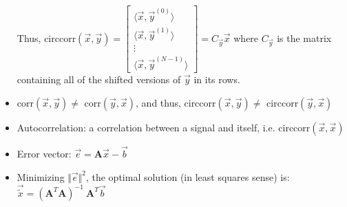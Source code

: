 \documentclass{article}
\begin{document}
\begin{itemize}
		Thus, circcorr$(\vec{x}, \vec{y}) = \begin{bmatrix}
		\big\langle \vec{x}, \vec{y}^{(0)} \big\rangle \\
		\big\langle \vec{x}, \vec{y}^{(1)} \big\rangle \\
		\vdots \\
		\big\langle \vec{x}, \vec{y}^{(N-1)} \big\rangle
		\end{bmatrix} = C_{\vec{y}} \vec{x}$
		where $C_{\vec{y}}$ is the matrix containing all of the shifted versions of $\vec{y}$ in its rows.
	\item corr$(\vec{x}, \vec{y}) \neq$ corr$(\vec{y}, \vec{x})$, and thus,
		circcorr$(\vec{x}, \vec{y}) \neq$ circcorr$(\vec{y}, \vec{x})$
	\item {\color{blue} Autocorrelation}: a correlation between a signal and itself, i.e. circcorr$(\vec{x}, \vec{x})$
\end{itemize}



\begin{itemize}
	\item Error vector: $\vec{e} = \mathbf{A}\vec{x} - \vec{b}$
	\item Minimizing $\Vert\vec{e}\Vert^2$, the optimal solution (in least squares sense) is:
		$\vec{\tilde{x}} = (\mathbf{A}^T \mathbf{A})^{-1}\ \mathbf{A}^T \vec{b}$


\end{itemize}
\end{document}
